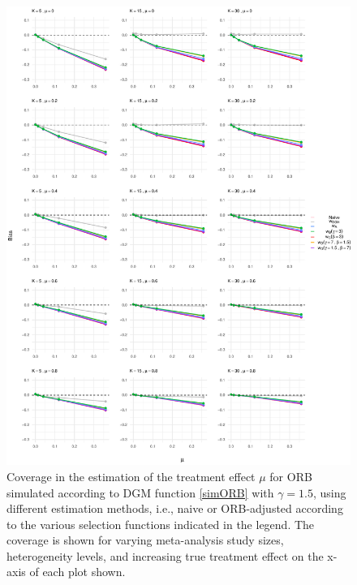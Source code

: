 \documentclass[twocolumn]{article}\usepackage[]{graphicx}\usepackage[]{xcolor}
\makeatletter
\def\maxwidth{ %
  \ifdim\Gin@nat@width>\linewidth
    \linewidth
  \else
    \Gin@nat@width
  \fi
}
\makeatother
\begin{document}

\begin{figure}[!hbt]
\centering
\caption{Coverage in the estimation of the treatment effect $\mu$ for ORB simulated according to DGM function \eqref{simORB} with $\gamma=1.5$, using different estimation methods, i.e., naive or ORB-adjusted according to the various selection functions indicated in the legend. The coverage is shown for varying meta-analysis study sizes, heterogeneity levels, and increasing true treatment effect on the x-axis of each plot shown.\\[0.5em]}


{\centering \includegraphics[width=\maxwidth]{figures/plots-unnamed-chunk-7-1} 

}



\label{Cov1}
\end{figure}
\end{document}
